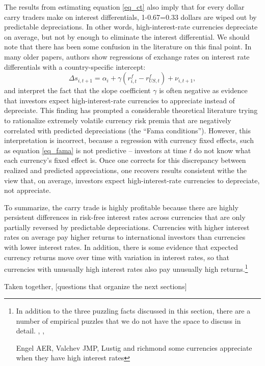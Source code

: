 The results from estimating equation \eqref{eq_ct} also imply that for 
every dollar carry traders make on interest differentials, 1-0.67=0.33 
dollars are wiped out by predictable depreciations. In other words,
high-interest-rate currencies depreciate on average, but not by 
enough to eliminate the interest differential. We should note that 
there has been some confusion in the literature on this final point. 
In many older papers, authors show regressions of exchange rates on 
interest rate differentials with a country-specific intercept:
\begin{equation}
    \Delta s_{i,t+1} 
    = \alpha_i + \gamma \left(r^f_{i, t} - r^f_{US, t}\right) + \nu_{i, t+1},
\label{eq_fama} 
\end{equation}
and interpret the fact that the slope coefficient $\gamma$ is often 
negative as evidence that investors expect high-interest-rate 
currencies to appreciate instead of depreciate. This finding has 
prompted a considerable theoretical literature trying to rationalize 
extremely volatile currency risk premia that are negatively correlated 
with predicted depreciations (the ``Fama conditions''). However, this
interpretation is incorrect, because a regression with currency fixed
effects, such as equation \eqref{eq_fama} is not predictive -- investors at
time $t$ do not know what each currency's fixed effect is. Once one
corrects for this discrepancy between realized and predicted
appreciations, one recovers results consistent withe the view that, on
average, investors expect high-interest-rate currencies to depreciate,
not appreciate.

To summarize, the carry trade is highly profitable because there are 
highly persistent differences in risk-free interest rates across 
currencies that are only partially reversed by predictable 
depreciations. Currencies with higher interest rates on average pay 
higher returns to international investors than currencies with lower 
interest rates. In addition, there is some evidence that expected 
currency returns move over time with variation in interest rates, 
so that currencies with unusually high interest rates also pay 
unusually high returns.\footnote{In addition to the three puzzling
facts discussed in this section, there are a number of empirical 
puzzles that we do not have the space to discuss in detail. 
\citet{LRV2014}, \citet{ChinnMeredith2004}, \citet{LustigStathopoulosVerdelhan2019}
\citet{}

Engel AER, Valchev JMP, 
Lustig and richmond some currencies appreciate when they have 
high interest rates}

Taken together, [questions that organize the next sections]

